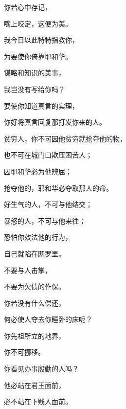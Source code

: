 {\par }{\Q {}你若心中存记，
\par }{\Q 嘴上咬定，这便为美。
\par }{\Q {}我今日以此特特指教你，
\par }{\Q 为要使你倚靠耶和华。
\par }{\Q {}谋略和知识的美事，
\par }{\Q 我岂没有写给你吗？
\par }{\Q {}要使你知道真言的实理，
\par }{\Q 你好将真言回复那打发你来的人。
\par }{\BB \par }{\Q {}贫穷人，你不可因他贫穷就抢夺他的物，
\par }{\Q 也不可在城门口欺压困苦人；
\par }{\Q {}因耶和华必为他辨屈；
\par }{\Q 抢夺他的，耶和华必夺取那人的命。
\par }{\BB \par }{\Q {}好生气的人，不可与他结交；
\par }{\Q 暴怒的人，不可与他来往；
\par }{\Q {}恐怕你效法他的行为，
\par }{\Q 自己就陷在网罗里。
\par }{\BB \par }{\Q {}不要与人击掌，
\par }{\Q 不要为欠债的作保。
\par }{\Q {}你若没有什么偿还，
\par }{\Q 何必使人夺去你睡卧的床呢？
\par }{\Q {}你先祖所立的地界，
\par }{\Q 你不可挪移。
\par }{\BB \par }{\Q {}你看见办事殷勤的人吗？
\par }{\Q 他必站在君王面前，
\par }{\Q 必不站在下贱人面前。

}
